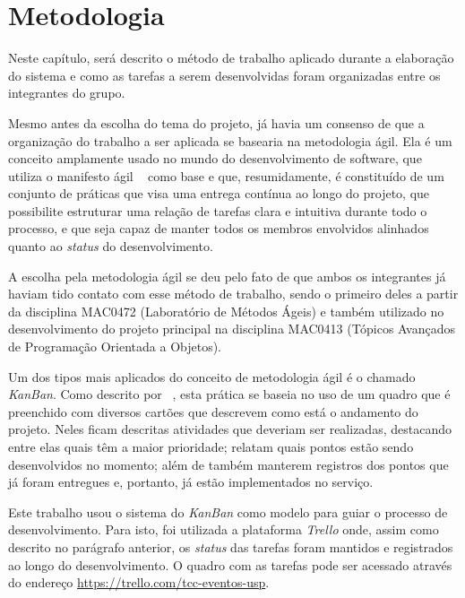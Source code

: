 \chapter{Metodologia}

Neste capítulo, será descrito o método de trabalho aplicado durante a
elaboração do sistema e como as tarefas a serem desenvolvidas foram organizadas
entre os integrantes do grupo.

Mesmo antes da escolha do tema do projeto, já havia um consenso de que a
organização do trabalho a ser aplicada se basearia na metodologia ágil. Ela é
um conceito amplamente usado no mundo do desenvolvimento de software, que
utiliza o manifesto ágil ~\citet{agileManifesto} como base e que,
resumidamente, é constituído de um conjunto de práticas que visa uma entrega
contínua ao longo do projeto, que possibilite estruturar uma relação de tarefas
clara e intuitiva durante todo o processo, e que seja capaz de manter todos os
membros envolvidos alinhados quanto ao \textit{status} do desenvolvimento.

A escolha pela metodologia ágil se deu pelo fato de que ambos os integrantes já
haviam tido contato com esse método de trabalho, sendo o primeiro deles a
partir da disciplina MAC0472 (Laboratório de Métodos Ágeis) e também utilizado
no desenvolvimento do projeto principal na disciplina MAC0413 (Tópicos
Avançados de Programação Orientada a Objetos).

Um dos tipos mais aplicados do conceito de metodologia ágil é o chamado
\textit{KanBan}. Como descrito por ~\citet{wakode2015overview}, esta prática se
baseia no uso de um quadro que é preenchido com diversos cartões que descrevem
como está o andamento do projeto. Neles ficam descritas atividades que deveriam
ser realizadas, destacando entre elas quais têm a maior prioridade; relatam
quais pontos estão sendo desenvolvidos no momento; além de também manterem
registros dos pontos que já foram entregues e, portanto, já estão implementados
no serviço.

Este trabalho usou o sistema do \textit{KanBan} como modelo para guiar o
processo de desenvolvimento. Para isto, foi utilizada a plataforma
\textit{Trello} onde, assim como descrito no parágrafo anterior, os
\textit{status} das tarefas foram mantidos e registrados ao longo do
desenvolvimento. O quadro com as tarefas pode ser acessado através do endereço
\href{https://trello.com/b/kGpOiOTE/tcc-eventos-usp}{https://trello.com/tcc-eventos-usp}.

